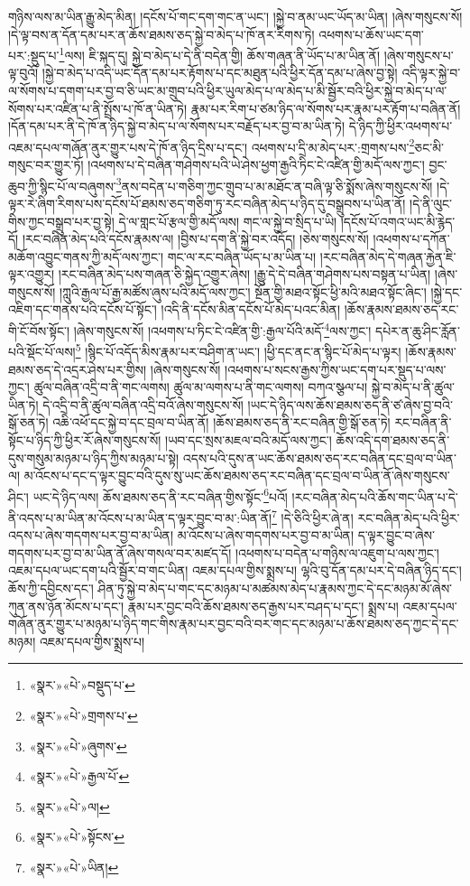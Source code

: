 གཉིས་ལས་མ་ཡིན་རྒྱུ་མེད་མིན། །དངོས་པོ་གང་དག་གང་ན་ཡང་། །སྐྱེ་བ་ནམ་ཡང་ཡོད་མ་ཡིན། །ཞེས་གསུངས་སོ། །དེ་ལྟ་བས་ན་དོན་དམ་པར་ན་ཆོས་ཐམས་ཅད་སྐྱེ་བ་མེད་པ་ཁོ་ནར་རིགས་ཏེ། འཕགས་པ་ཆོས་ཡང་དག་པར་:སྡུད་པ་\footnote{«སྣར་»«པེ་»བསྡུད་པ་}ལས། ཇི་སྐད་དུ། སྐྱེ་བ་མེད་པ་དེ་ནི་བདེན་གྱི། ཆོས་གཞན་ནི་ཡོད་པ་མ་ཡིན་ནོ། །ཞེས་གསུངས་པ་ལྟ་བུའོ། །སྐྱེ་བ་མེད་པ་འདི་ཡང་དོན་དམ་པར་རྟོགས་པ་དང་མཐུན་པའི་ཕྱིར་དོན་དམ་པ་ཞེས་བྱ་སྟེ། འདི་ལྟར་སྐྱེ་བ་ལ་སོགས་པ་དགག་པར་བྱ་བ་ཅི་ཡང་མ་གྲུབ་པའི་ཕྱིར་ཡུལ་མེད་པ་ལ་མེད་པ་མི་སྦྱོར་བའི་ཕྱིར་སྐྱེ་བ་མེད་པ་ལ་སོགས་པར་འཛིན་པ་ནི་སྤྲོས་པ་ཁོ་ན་ཡིན་ཏེ། རྣམ་པར་རིག་པ་ཙམ་ཉིད་ལ་སོགས་པར་རྣམ་པར་རྟོག་པ་བཞིན་ནོ། །དོན་དམ་པར་ནི་དེ་ཁོ་ན་ཉིད་སྐྱེ་བ་མེད་པ་ལ་སོགས་པར་བརྗོད་པར་བྱ་བ་མ་ཡིན་ཏེ། དེ་ཉིད་ཀྱི་ཕྱིར་འཕགས་པ་འཇམ་དཔལ་གཞོན་ནུར་གྱུར་པས་དེ་ཁོ་ན་ཉིད་དྲིས་པ་དང་། འཕགས་པ་དྲི་མ་མེད་པར་:གྲགས་པས་\footnote{«སྣར་»«པེ་»གྲགས་པ་}ཅང་མི་གསུང་བར་གྱུར་ཏོ། །འཕགས་པ་དེ་བཞིན་གཤེགས་པའི་ཡེ་ཤེས་ཕྱག་རྒྱའི་ཏིང་ངེ་འཛིན་གྱི་མདོ་ལས་ཀྱང་། བྱང་ཆུབ་ཀྱི་སྙིང་པོ་ལ་བཞུགས་\footnote{«སྣར་»«པེ་»ཞུགས་}ནས་བདེན་པ་གཅིག་ཀྱང་གྲུབ་པ་མ་མཐོང་ན་བཞི་ལྟ་ཅི་སྨོས་ཞེས་གསུངས་སོ། །དེ་ལྟར་རེ་ཞིག་རིགས་པས་དངོས་པོ་ཐམས་ཅད་གཅིག་ཏུ་རང་བཞིན་མེད་པ་ཉིད་དུ་བསྒྲུབས་པ་ཡིན་ནོ། །དེ་ནི་ལུང་གིས་ཀྱང་བསྒྲུབ་པར་བྱ་སྟེ། དེ་ལ་གླང་པོ་རྩལ་གྱི་མདོ་ལས། གང་ལ་སྐྱེ་བ་སྲིད་པ་ཡི། །དངོས་པོ་འགའ་ཡང་མི་རྙེད་དོ། །རང་བཞིན་མེད་པའི་དངོས་རྣམས་ལ། །བྱིས་པ་དག་ནི་སྐྱེ་བར་འདོད། །ཅེས་གསུངས་སོ། །འཕགས་པ་དཀོན་མཆོག་འབྱུང་གནས་ཀྱི་མདོ་ལས་ཀྱང་། གང་ལ་རང་བཞིན་ཡོད་པ་མ་ཡིན་པ། །རང་བཞིན་མེད་དེ་གཞན་རྐྱེན་ཇི་ལྟར་འགྱུར། །རང་བཞིན་མེད་པས་གཞན་ཅི་སྐྱེད་འགྱུར་ཞེས། །རྒྱུ་དེ་དེ་བཞིན་གཤེགས་པས་བསྟན་པ་ཡིན། །ཞེས་གསུངས་སོ། །ཀླུའི་རྒྱལ་པོ་རྒྱ་མཚོས་ཞུས་པའི་མདོ་ལས་ཀྱང་། སྔོན་གྱི་མཐའ་སྟོང་ཕྱི་མའི་མཐའ་སྟོང་ཞིང་། །སྐྱེ་དང་འཇིག་དང་གནས་པའི་དངོས་པོ་སྟོང་། །འདི་ནི་དངོས་མིན་དངོས་པོ་མེད་པའང་མིན། །ཆོས་རྣམས་ཐམས་ཅད་རང་གི་ངོ་བོས་སྟོང་། །ཞེས་གསུངས་སོ། །འཕགས་པ་ཏིང་ངེ་འཛིན་གྱི་:རྒྱལ་པོའི་མདོ་\footnote{«སྣར་»«པེ་»རྒྱལ་པོ་}ལས་ཀྱང་། དཔེར་ན་ཆུ་ཤིང་རློན་པའི་སྡོང་པོ་ལས།\footnote{«སྣར་»«པེ་»ལ།} །སྙིང་པོ་འདོད་མིས་རྣམ་པར་བཤིག་ན་ཡང་། །ཕྱི་དང་ནང་ན་སྙིང་པོ་མེད་པ་ལྟར། །ཆོས་རྣམས་ཐམས་ཅད་དེ་འདྲར་ཤེས་པར་གྱིས། །ཞེས་གསུངས་སོ། །འཕགས་པ་སངས་རྒྱས་ཀྱིས་ཡང་དག་པར་སྡུད་པ་ལས་ཀྱང་། ཚུལ་བཞིན་འདྲི་བ་ནི་གང་ལགས། ཚུལ་མ་ལགས་པ་ནི་གང་ལགས། བཀའ་སྩལ་པ། སྐྱེ་བ་མེད་པ་ནི་ཚུལ་ཡིན་ཏེ། དེ་འདྲི་བ་ནི་ཚུལ་བཞིན་འདྲི་བའོ་ཞེས་གསུངས་སོ། །ཡང་དེ་ཉིད་ལས་ཆོས་ཐམས་ཅད་ནི་ཙ་ཞེས་བྱ་བའི་སྒོ་ཅན་ཏེ། འཆི་འཕོ་དང་སྐྱེ་བ་དང་བྲལ་བ་ཡིན་ནོ། །ཆོས་ཐམས་ཅད་ནི་རང་བཞིན་གྱི་སྒོ་ཅན་ཏེ། རང་བཞིན་ནི་སྟོང་པ་ཉིད་ཀྱི་ཕྱིར་རོ་ཞེས་གསུངས་སོ། །ཡབ་དང་སྲས་མཇལ་བའི་མདོ་ལས་ཀྱང་། ཆོས་འདི་དག་ཐམས་ཅད་ནི་དུས་གསུམ་མཉམ་པ་ཉིད་ཀྱིས་མཉམ་པ་སྟེ། འདས་པའི་དུས་ན་ཡང་ཆོས་ཐམས་ཅད་རང་བཞིན་དང་བྲལ་བ་ཡིན་ལ། མ་འོངས་པ་དང་ད་ལྟར་བྱུང་བའི་དུས་སུ་ཡང་ཆོས་ཐམས་ཅད་རང་བཞིན་དང་བྲལ་བ་ཡིན་ནོ་ཞེས་གསུངས་ཤིང་། ཡང་དེ་ཉིད་ལས། ཆོས་ཐམས་ཅད་ནི་རང་བཞིན་གྱིས་སྟོང་\footnote{«སྣར་»«པེ་»སྟོངས་}པའོ། །རང་བཞིན་མེད་པའི་ཆོས་གང་ཡིན་པ་དེ་ནི་འདས་པ་མ་ཡིན་མ་འོངས་པ་མ་ཡིན་ད་ལྟར་བྱུང་བ་མ་:ཡིན་ནོ།\footnote{«སྣར་»«པེ་»ཡིན།} །དེ་ཅིའི་ཕྱིར་ཞེ་ན། རང་བཞིན་མེད་པའི་ཕྱིར་འདས་པ་ཞེས་གདགས་པར་བྱ་བ་མ་ཡིན། མ་འོངས་པ་ཞེས་གདགས་པར་བྱ་བ་མ་ཡིན། ད་ལྟར་བྱུང་བ་ཞེས་གདགས་པར་བྱ་བ་མ་ཡིན་ནོ་ཞེས་གསལ་བར་མཛད་དོ། །འཕགས་པ་བདེན་པ་གཉིས་ལ་འཇུག་པ་ལས་ཀྱང་། འཇམ་དཔལ་ཡང་དག་པའི་སྦྱོར་བ་གང་ཡིན། འཇམ་དཔལ་གྱིས་སྨྲས་པ། ལྷའི་བུ་དོན་དམ་པར་དེ་བཞིན་ཉིད་དང་། ཆོས་ཀྱི་དབྱིངས་དང་། ཤིན་ཏུ་སྐྱེ་བ་མེད་པ་གང་དང་མཉམ་པ་མཚམས་མེད་པ་རྣམས་ཀྱང་དེ་དང་མཉམ་མོ་ཞེས་ཀུན་ནས་ཉོན་མོངས་པ་དང་། རྣམ་པར་བྱང་བའི་ཆོས་ཐམས་ཅད་རྒྱས་པར་བཤད་པ་དང་། སྨྲས་པ། འཇམ་དཔལ་གཞོན་ནུར་གྱུར་པ་མཉམ་པ་ཉིད་གང་གིས་རྣམ་པར་བྱང་བའི་བར་གང་དང་མཉམ་པ་ཆོས་ཐམས་ཅད་ཀྱང་དེ་དང་མཉམ། འཇམ་དཔལ་གྱིས་སྨྲས་པ། 